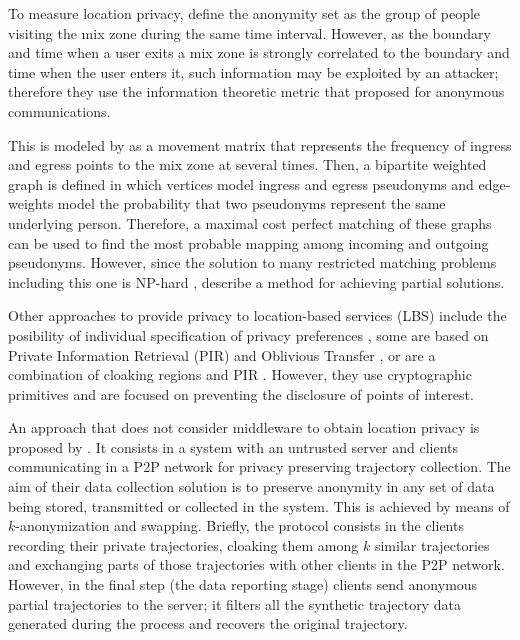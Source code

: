 \documentclass[times,twocolumn,final,authoryear]{elsarticle}
\begin{document}
To measure location privacy, \cite{Beresford04mixzones} define the anonymity set as the group of people visiting the mix zone during the same time interval. However, as the boundary and time when a user exits a mix zone is strongly correlated to the boundary and time when the user enters it, such information may be exploited by an attacker; therefore they use the information theoretic metric that \cite{Serjantov2002} proposed for anonymous communications. 

This is modeled by \cite{Beresford04mixzones} as a movement matrix that represents the frequency of ingress and egress points to the mix zone at several times.
Then, a bipartite weighted graph is defined in which vertices model ingress and egress pseudonyms and edge-weights
model the probability that two pseudonyms represent the same underlying person. Therefore, a maximal cost perfect matching of these graphs can be used to find the most probable mapping among incoming and outgoing pseudonyms.  
However, since the solution to many restricted matching problems including this one is NP-hard \citep{Tanimoto1978}, \cite{Beresford04mixzones} describe a method for achieving partial solutions.

Other approaches to provide privacy to location-based services (LBS) include the posibility of individual specification of privacy preferences \citep{Damiani:2009}, some are based on Private Information Retrieval (PIR) and Oblivious Transfer \citep{Paulet:2014}, or are a combination of cloaking regions and PIR \citep{Ghinita:2011}. However, they use cryptographic primitives and are focused on preventing the disclosure of points of interest.

An approach that does not consider middleware to obtain location privacy is proposed by \citet[Chapter 9]{Gidofalvi2007}. It consists in a system with an untrusted server and clients communicating in a P2P network for privacy preserving trajectory collection.
The aim of their data collection solution is to preserve anonymity in any set of data being stored, transmitted or
collected in the system. This is achieved by means of $k$-anonymization and swapping.
Briefly, the protocol consists in the clients recording their private trajectories, cloaking them among $k$ similar trajectories and exchanging parts of those trajectories with other clients in the P2P network. However, in the final step (the data reporting stage) clients send anonymous partial trajectories to the server; it filters all the synthetic trajectory data generated during the process and recovers the original trajectory.
\end{document}
